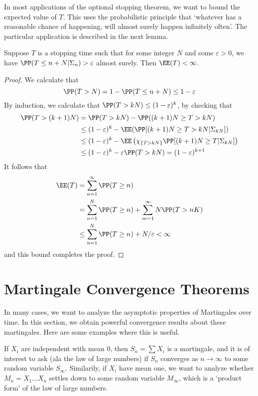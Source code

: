 In most applications of the optional stopping theorem, we want to bound the expected value of $T$. This uses the probabilistic principle that `whatever has a reasonable chance of happening, will almost surely happen infinitely often'. The particular application is described in the next lemma.

\begin{lemma}
    Suppose $T$ is a stopping time such that for some integer $N$ and some $\varepsilon > 0$, we have $\PP(T \leq n + N | \Sigma_n) > \varepsilon$ almost surely. Then $\EE(T) < \infty$.
\end{lemma}
\begin{proof}
    We calculate that
    \[ \PP(T > N) = 1 - \PP(T \leq n + N) \leq 1 - \varepsilon \]
    By induction, we calculate that $\PP(T > kN) \leq (1 - \varepsilon)^k$, by checking that
    \begin{align*}
        \PP(T > (k+1)N) &= \PP(T > kN) - \PP((k+1)N \geq T > kN)\\
        &\leq (1 - \varepsilon)^k - \EE(\PP[(k+1)N \geq T > kN | \Sigma_{kN} ])\\
        &\leq (1 - \varepsilon)^k - \EE \left( \chi_{\{ T > kN \}} \PP[(k+1)N \geq T | \Sigma_{kN}] \right)\\
        &\leq (1 - \varepsilon)^k - \varepsilon \PP(T > kN) = (1 - \varepsilon)^{k+1}
    \end{align*}
    It follows that
    \begin{align*}
        \EE(T) &= \sum_{n = 1}^\infty \PP(T \geq n)\\
        &= \sum_{n = 1}^N \PP(T \geq n) + \sum_{m = 1}^\infty N \PP(T > nK)\\
        &\leq \sum_{n = 1}^N \PP(T \geq n) + N/\varepsilon < \infty
    \end{align*}
    and this bound completes the proof.
\end{proof}

\section{Martingale Convergence Theorems}

In many cases, we want to analyze the asymptotic properties of Martingales over time. In this section, we obtain powerful convergence results about these martingales. Here are some examples where this is useful.

\begin{example}
    If $X_i$ are independent with mean $0$, then $S_n = \sum X_i$ is a martingale, and it is of interest to ask (ala the law of large numbers) if $S_n$ converges as $n \to \infty$ to some random variable $S_\infty$. Similarily, if $X_i$ have mean one, we want to analyze whether $M_n = X_1 \dots X_n$ settles down to some random variable $M_\infty$, which is a `product form' of the law of large numbers.
\end{example}

